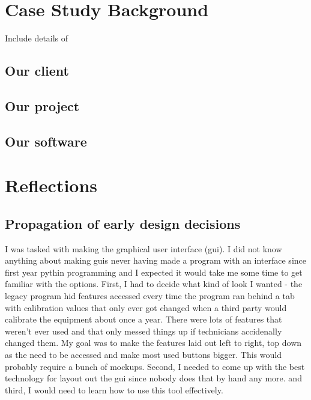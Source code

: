 \documentclass{l3proj}
\begin{document}
\section{Case Study Background}

Include details of 

\subsection{Our client}
\subsection{Our project}
\subsection{Our software}

\section{Reflections}
\subsection{Propagation of early design decisions}

I was tasked with making the graphical user interface (gui). I did not know anything about making guis never having made a program with an interface since first year pythin programming and I expected it would take me some time to get familiar with the options. First, I had to decide what kind of look I wanted - the legacy program hid features accessed every time the program ran behind a tab with calibration values that only ever got changed when a third party would calibrate the equipment about once a year. There were lots of features that weren't ever used and that only messed things up if technicians accidenally changed them. My goal was to make the features laid out left to right, top down as the need to be accessed and make most used buttons bigger. This would probably require a bunch of mockups. 
Second, I needed to come up with the best technology for layout out the gui since nobody does that by hand any more. and third, I would need to learn how to use this tool effectively.
\end{document}
